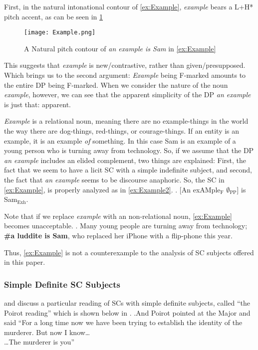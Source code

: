 \documentclass[
	letterpaper,
]{article}
\begin{document}
First, in the natural intonational contour of \ref{ex:Example}, \textit{example} bears a L+H* pitch accent, as can be seen in \ref{fig:Example}
\begin{figure}[h]
	\centering
	\texttt{[image: Example.png]}
	\caption{A Natural pitch contour of \textit{an example is Sam} in \ref{ex:Example}}
	\label{fig:Example}
\end{figure}
This suggests that \textit{example} is new/contrastive, rather than given/presupposed.
Which brings us to the second argument: \textit{Example} being F-marked amounts to the entire DP being F-marked.
When we consider the nature of the noun \textit{example}, however, we can see that the apparent simplicity of the DP \textit{an example} is just that: apparent.

\textit{Example} is a relational noun, meaning there are no example-things in the world the way there are dog-things, red-things, or courage-things.
If an entity is an example, it is an example \textit{of} something.
In this case Sam is an example of a young person who is turning away from technology.
So, if we assume that the DP \textit{an example} includes an elided complement, two things are explained:
First, the fact that we seem to have a licit SC with a simple indefinite subject, and second, the fact that \textit{an example} seems to be discourse anaphoric.
So, the SC in \ref{ex:Example}, is properly analyzed as in \ref{ex:Example2}.
\ex. \label{ex:Example2} [An exAMple$_\text{F}$ $\emptyset_\text{PP}$] is Sam$_\text{Exh}$.

Note that if we replace \textit{example} with an non-relational noun, \ref{ex:Example} becomes unacceptable.
\ex. \label{ex:Luddite} Many young people are turning away from technology; \textbf{\#a luddite is Sam}, who replaced her iPhone with a flip-phone this year.

Thus, \ref{ex:Example} is not a counterexample to the analysis of SC subjects offered in this paper.
\subsubsection{Simple Definite SC Subjects}

\textcite{heycock2010variability} and \textcite{bejarkahnemuyipour2013agreement} discuss a particular reading of SCs with simple definite subjects, called ``the Poirot reading'' which is shown below in \Next.
\ex.And Poirot pointed at the Major and said ``For a long time now we have been trying to establish the identity of the murderer. But now I know\ldots\\
\ldots The murderer is you''
\end{document}
